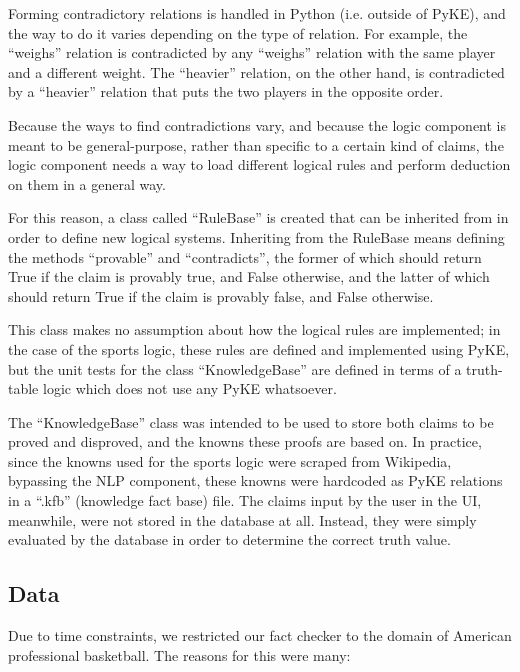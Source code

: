 \documentclass{chi2009}
\begin{document}
Forming contradictory relations is handled in Python (i.e. outside of PyKE), and the way to do it varies depending on the type of relation. For example, the ``weighs'' relation is contradicted by any ``weighs'' relation with the same player and a different weight. The ``heavier'' relation, on the other hand, is contradicted by a ``heavier'' relation that puts the two players in the opposite order.

Because the ways to find contradictions vary, and because the logic component is meant to be general-purpose, rather than specific to a certain kind of claims, the logic component needs a way to load different logical rules and perform deduction on them in a general way.

For this reason, a class called ``RuleBase'' is created that can be inherited from in order to define new logical systems.
Inheriting from the RuleBase means defining the methods ``provable'' and ``contradicts'', the former of which should return True if the claim is provably true, and False otherwise, and the latter of which should return True if the claim is provably false, and False otherwise.

This class makes no assumption about how the logical rules are implemented; in the case of the sports logic, these rules are defined and implemented using PyKE, but the unit tests for the class ``KnowledgeBase'' are defined in terms of a truth-table logic which does not use any PyKE whatsoever.

The ``KnowledgeBase'' class was intended to be used to store both claims to be proved and disproved, and the knowns these proofs are based on.
In practice, since the knowns used for the sports logic were scraped from Wikipedia, bypassing the NLP component, these knowns were hardcoded as PyKE relations in a ``.kfb'' (knowledge fact base) file.
The claims input by the user in the UI, meanwhile, were not stored in the database at all.
Instead, they were simply evaluated by the database in order to determine the correct truth value.

\subsection{Data}
Due to time constraints, we restricted our fact checker to the domain of American professional basketball.  The reasons for this were many:
\end{document}
